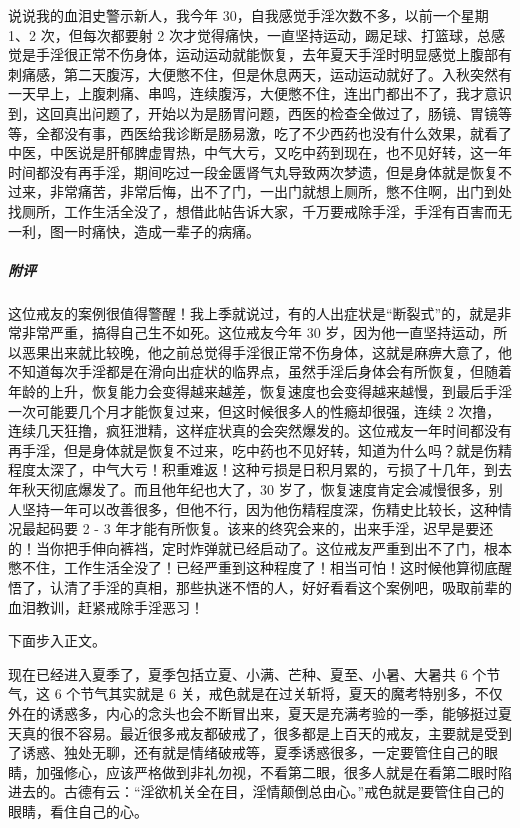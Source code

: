 \begin{case}
    说说我的血泪史警示新人，我今年 30，自我感觉手淫次数不多，以前一个星期 1、2 次，但每次都要射 2 次才觉得痛快，一直坚持运动，踢足球、打篮球，总感觉是手淫很正常不伤身体，运动运动就能恢复，去年夏天手淫时明显感觉上腹部有刺痛感，第二天腹泻，大便憋不住，但是休息两天，运动运动就好了。入秋突然有一天早上，上腹刺痛、串鸣，连续腹泻，大便憋不住，连出门都出不了，我才意识到，这回真出问题了，开始以为是肠胃问题，西医的检查全做过了，肠镜、胃镜等等，全都没有事，西医给我诊断是肠易激，吃了不少西药也没有什么效果，就看了中医，中医说是肝郁脾虚胃热，中气大亏，又吃中药到现在，也不见好转，这一年时间都没有再手淫，期间吃过一段金匮肾气丸导致两次梦遗，但是身体就是恢复不过来，非常痛苦，非常后悔，出不了门，一出门就想上厕所，憋不住啊，出门到处找厕所，工作生活全没了，想借此帖告诉大家，千万要戒除手淫，手淫有百害而无一利，图一时痛快，造成一辈子的病痛。
    \subparagraph{附评} 这位戒友的案例很值得警醒！我上季就说过，有的人出症状是“断裂式”的，就是非常非常严重，搞得自己生不如死。这位戒友今年 30 岁，因为他一直坚持运动，所以恶果出来就比较晚，他之前总觉得手淫很正常不伤身体，这就是麻痹大意了，他不知道每次手淫都是在滑向出症状的临界点，虽然手淫后身体会有所恢复，但随着年龄的上升，恢复能力会变得越来越差，恢复速度也会变得越来越慢，到最后手淫一次可能要几个月才能恢复过来，但这时候很多人的性瘾却很强，连续 2 次撸，连续几天狂撸，疯狂泄精，这样症状真的会突然爆发的。这位戒友一年时间都没有再手淫，但是身体就是恢复不过来，吃中药也不见好转，知道为什么吗？就是伤精程度太深了，中气大亏！积重难返！这种亏损是日积月累的，亏损了十几年，到去年秋天彻底爆发了。而且他年纪也大了，30 岁了，恢复速度肯定会减慢很多，别人坚持一年可以改善很多，但他不行，因为他伤精程度深，伤精史比较长，这种情况最起码要 2 - 3 年才能有所恢复。该来的终究会来的，出来手淫，迟早是要还的！当你把手伸向裤裆，定时炸弹就已经启动了。这位戒友严重到出不了门，根本憋不住，工作生活全没了！已经严重到这种程度了！相当可怕！这时候他算彻底醒悟了，认清了手淫的真相，那些执迷不悟的人，好好看看这个案例吧，吸取前辈的血泪教训，赶紧戒除手淫恶习！
\end{case}

下面步入正文。

现在已经进入夏季了，夏季包括立夏、小满、芒种、夏至、小暑、大暑共 6 个节气，这 6 个节气其实就是 6 关，戒色就是在过关斩将，夏天的魔考特别多，不仅外在的诱惑多，内心的念头也会不断冒出来，夏天是充满考验的一季，能够挺过夏天真的很不容易。最近很多戒友都破戒了，很多都是上百天的戒友，主要就是受到了诱惑、独处无聊，还有就是情绪破戒等，夏季诱惑很多，一定要管住自己的眼睛，加强修心，应该严格做到非礼勿视，不看第二眼，很多人就是在看第二眼时陷进去的。古德有云：“淫欲机关全在目，淫情颠倒总由心。”戒色就是要管住自己的眼睛，看住自己的心。

